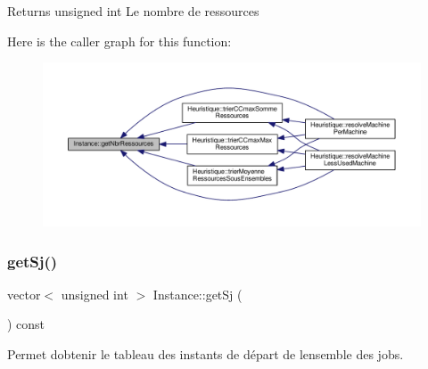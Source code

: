 \begin{DoxyReturn}{Returns}
unsigned int Le nombre de ressources 
\end{DoxyReturn}
Here is the caller graph for this function\+:
\nopagebreak
\begin{figure}[H]
\begin{center}
\leavevmode
\includegraphics[width=350pt]{classInstance_a79b49dcc3d590b823e41d8a223ecf25d_icgraph}
\end{center}
\end{figure}
\mbox{\label{classInstance_ab998bc8d9a8b03c8f6279573779217cc}} 
\subsubsection{\texorpdfstring{get\+Sj()}{getSj()}}
{\footnotesize\ttfamily vector$<$ unsigned int $>$ Instance\+::get\+Sj (\begin{DoxyParamCaption}{ }\end{DoxyParamCaption}) const}



Permet d\textquotesingle{}obtenir le tableau des instants de départ de l\textquotesingle{}ensemble des jobs. 

